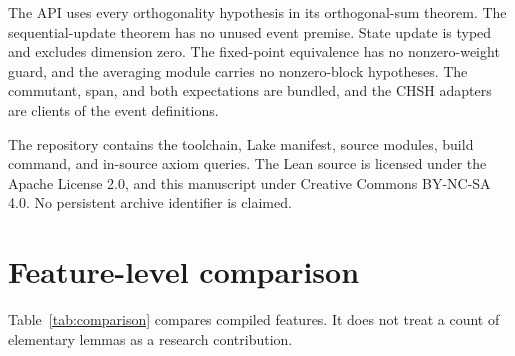\documentclass[11pt]{article}
\renewcommand{\_}{\textunderscore\allowbreak}
\theoremstyle{remark}
\begin{document}
The API uses every orthogonality hypothesis in its orthogonal-sum
theorem. The sequential-update theorem has no unused event premise. State
update is typed and excludes dimension zero. The fixed-point equivalence has
no nonzero-weight guard, and the averaging module carries no nonzero-block
hypotheses. The commutant, span, and both expectations are bundled, and the
CHSH adapters are clients of the event definitions.

The repository contains the toolchain, Lake manifest, source modules, build
command, and in-source axiom queries. The Lean source is licensed under the
Apache License 2.0, and this manuscript under Creative Commons BY-NC-SA 4.0.
No persistent archive identifier is claimed.

\section{Feature-level comparison}
\label{sec:comparison}

Table~\ref{tab:comparison} compares compiled features. It does not treat a
count of elementary lemmas as a research contribution.
\end{document}
